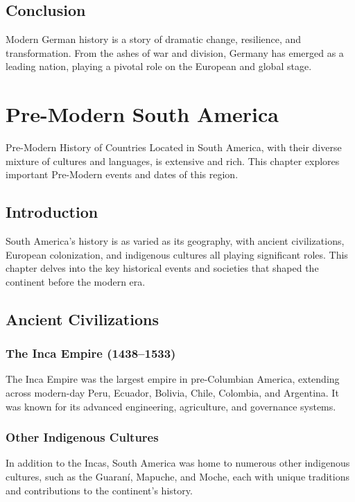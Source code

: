\documentclass{book}
\begin{document}
\section{Conclusion}
\label{sec:conclusion-modern-germany}
Modern German history is a story of dramatic change, resilience, and transformation. From the ashes of war and division, Germany has emerged as a leading nation, playing a pivotal role on the European and global stage.

\chapter{Pre-Modern South America}
\label{ch:pre-modern-history-south-america}

Pre-Modern History of Countries Located in South America, with their diverse mixture of cultures and languages, is extensive and rich. This chapter explores important Pre-Modern events and dates of this region.

\section{Introduction}
\label{sec:introduction-pre-modern-south-america}
South America’s history is as varied as its geography, with ancient civilizations, European colonization, and indigenous cultures all playing significant roles. This chapter delves into the key historical events and societies that shaped the continent before the modern era.

\section{Ancient Civilizations}
\label{sec:ancient-civilizations-south-america}

\subsection{The Inca Empire (1438–1533)}
\label{subsec:inca-empire}
The Inca Empire was the largest empire in pre-Columbian America, extending across modern-day Peru, Ecuador, Bolivia, Chile, Colombia, and Argentina. It was known for its advanced engineering, agriculture, and governance systems.

\subsection{Other Indigenous Cultures}
\label{subsec:other-indigenous-cultures}
In addition to the Incas, South America was home to numerous other indigenous cultures, such as the Guaraní, Mapuche, and Moche, each with unique traditions and contributions to the continent’s history.
\end{document}
